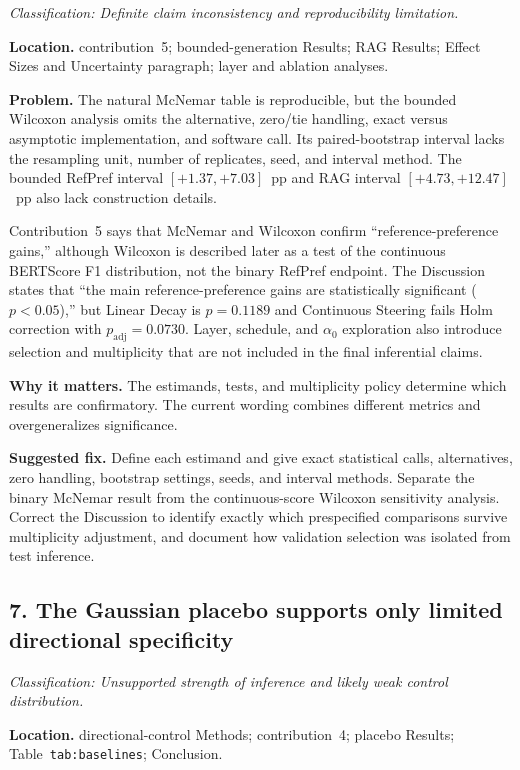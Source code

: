 \documentclass[11pt]{article}
\newcommand{\findinglabel}[1]{\textbf{#1}}
\newcommand{\classification}[1]{\textit{Classification: #1.}}
\begin{document}
\classification{Definite claim inconsistency and reproducibility limitation}

\findinglabel{Location.} contribution~5; bounded-generation Results; RAG Results; Effect Sizes and Uncertainty paragraph; layer and ablation analyses.

\findinglabel{Problem.} The natural McNemar table is reproducible, but the bounded Wilcoxon analysis omits the alternative, zero/tie handling, exact versus asymptotic implementation, and software call.  Its paired-bootstrap interval lacks the resampling unit, number of replicates, seed, and interval method.  The bounded RefPref interval $[+1.37,+7.03]$~pp and RAG interval $[+4.73,+12.47]$~pp also lack construction details.

Contribution~5 says that McNemar and Wilcoxon confirm ``reference-preference gains,'' although Wilcoxon is described later as a test of the continuous BERTScore F1 distribution, not the binary RefPref endpoint.  The Discussion states that ``the main reference-preference gains are statistically significant ($p<0.05$),'' but Linear Decay is $p=0.1189$ and Continuous Steering fails Holm correction with $p_{\mathrm{adj}}=0.0730$.  Layer, schedule, and $\alpha_0$ exploration also introduce selection and multiplicity that are not included in the final inferential claims.

\findinglabel{Why it matters.} The estimands, tests, and multiplicity policy determine which results are confirmatory.  The current wording combines different metrics and overgeneralizes significance.

\findinglabel{Suggested fix.} Define each estimand and give exact statistical calls, alternatives, zero handling, bootstrap settings, seeds, and interval methods.  Separate the binary McNemar result from the continuous-score Wilcoxon sensitivity analysis.  Correct the Discussion to identify exactly which prespecified comparisons survive multiplicity adjustment, and document how validation selection was isolated from test inference.

\subsection*{7. The Gaussian placebo supports only limited directional specificity}

\classification{Unsupported strength of inference and likely weak control distribution}

\findinglabel{Location.} directional-control Methods; contribution~4; placebo Results; Table~\texttt{tab:baselines}; Conclusion.
\end{document}
